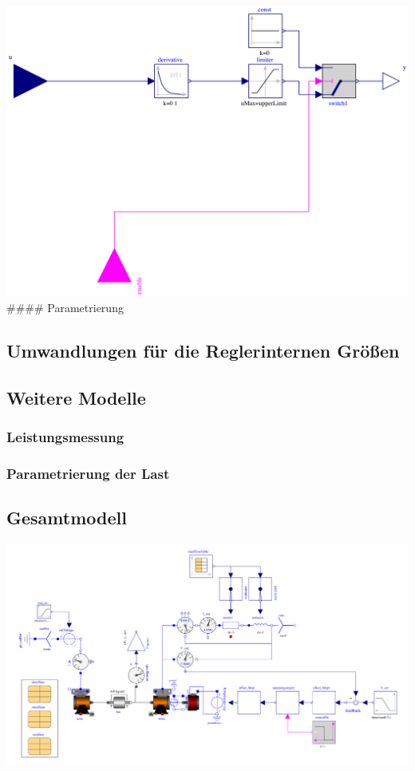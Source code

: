 \includegraphics{Bilder/DRegler.pdf} \#\#\#\# Parametrierung

\hypertarget{umwandlungen-fuxfcr-die-reglerinternen-gruxf6uxdfen}{%
\subsection{Umwandlungen für die Reglerinternen
Größen}\label{umwandlungen-fuxfcr-die-reglerinternen-gruxf6uxdfen}}

\hypertarget{weitere-modelle}{%
\subsection{Weitere Modelle}\label{weitere-modelle}}

\hypertarget{leistungsmessung}{%
\subsubsection{Leistungsmessung}\label{leistungsmessung}}

\hypertarget{parametrierung-der-last}{%
\subsubsection{Parametrierung der Last}\label{parametrierung-der-last}}

\hypertarget{gesamtmodell}{%
\subsection{Gesamtmodell}\label{gesamtmodell}}

\includegraphics{Bilder/Umformer.pdf}

